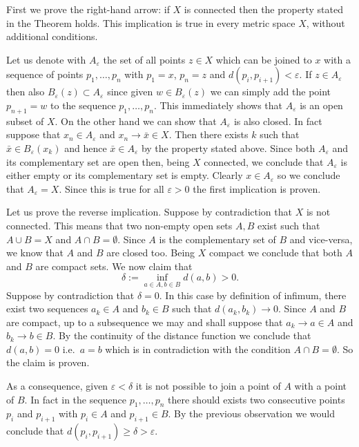 \documentclass[12pt]{article}
\begin{document}
First we prove the right-hand arrow: if $X$ is connected then the property stated in the Theorem holds. This implication is true in every metric space $X$, without additional conditions.

Let us denote with $A_\varepsilon$ the set of all points $z\in X$ which can be joined to $x$ with a sequence of points $p_1,\ldots,p_n$ with $p_1=x$, $p_n=z$ and $d(p_i,p_{i+1})<\varepsilon$. If $z\in A_\varepsilon$ then also $B_\varepsilon(z)\subset A_\varepsilon$ since given $w\in B_\varepsilon(z)$ we can simply add the point $p_{n+1}=w$ to the sequence $p_1,\ldots,p_n$.
This immediately shows that $A_\varepsilon$ is an open subset of $X$. On the other hand we can show that $A_\varepsilon$ is also closed. In fact suppose that $x_n\in A_\varepsilon$ and $x_n \to \bar x\in X$. Then there exists $k$ such that $\bar x\in B_\varepsilon(x_k)$ and hence $\bar x\in A_\varepsilon$ by the property stated above. Since both $A_\varepsilon$ and its complementary set are open then, 
being $X$ connected, we conclude that $A_\varepsilon$ is either empty or its complementary set is empty. Clearly $x\in A_\varepsilon$ so we conclude that $A_\varepsilon=X$. Since this is true for all $\varepsilon>0$ the first implication is proven.

Let us prove the reverse implication. Suppose by contradiction that $X$ is not connected. This means that two non-empty open sets $A,B$ exist such that 
$A\cup B=X$ and $A\cap B = \emptyset$. Since $A$ is the complementary set of $B$ and vice-versa, we know that $A$ and $B$ are closed too. Being $X$ compact we conclude that both $A$ and $B$ are compact sets.
We now claim that 
\[
   \delta:= \inf_{a\in A, b\in B} d(a,b) > 0. 
\]
Suppose by contradiction that $\delta=0$.
In this case by definition of infimum, there exist two sequences 
$a_k\in A$ and $b_k\in B$ such that $d(a_k,b_k)\to 0$. Since $A$ and $B$ are compact, up to a subsequence we may and shall suppose that $a_k \to a \in A$ and $b_k \to b \in B$. By the continuity of the distance function we conclude that $d(a,b)=0$ i.e.\ $a=b$ which is in contradiction with the condition $A\cap B=\emptyset$. So the claim is proven.

As a consequence, given $\varepsilon<\delta$ it is not possible to join a point of $A$ with a point of $B$. In fact in the sequence $p_1,\ldots,p_n$ there should exists two consecutive points $p_i$ and $p_{i+1}$ with $p_i\in A$ and $p_{i+1}\in B$. By the previous observation we would conclude that $d(p_i,p_{i+1})\ge \delta > \varepsilon$.
\end{document}
